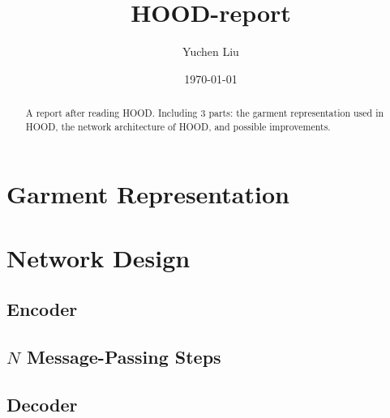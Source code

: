 \documentclass{article}
\title{HOOD-report}
\author{Yuchen Liu}
\date{\today}
\begin{document}
\maketitle
\begin{abstract}
    A report after reading HOOD\cite{grigorev2023hood}. Including 3 parts: the garment representation used in HOOD, the network architecture of HOOD, and possible improvements.
\end{abstract}
\section{Garment Representation}

\section{Network Design}
\subsection{Encoder}
\subsection{$N$ Message-Passing Steps}
\subsection{Decoder}



\end{document}
